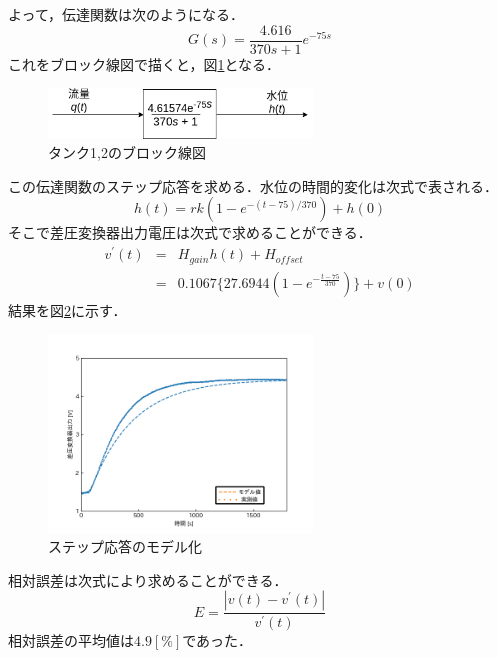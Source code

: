 \documentclass[12pt]{jsarticle}
\begin{document}
よって，伝達関数は次のようになる．
\begin{equation}
  \label{}
  G(s) = \frac{4.616}{370s+1}e^{-75s}
\end{equation}
これをブロック線図で描くと，図\ref{Tank_BlockDiag}となる．
\begin{figure}[tb]
  \begin{center}
    \includegraphics[clip,width=7.0cm]{../img/Tank_BlockDiag.png}
    \caption{タンク1,2のブロック線図}
    \label{Tank_BlockDiag}
  \end{center}
\end{figure}

この伝達関数のステップ応答を求める．水位の時間的変化は次式で表される．
\begin{equation}
  \label{}
  h(t) = rk(1 - e^{-(t - 75)/370}) + h(0)
\end{equation}
そこで差圧変換器出力電圧は次式で求めることができる．
\begin{eqnarray}
  \label{}
  v^{\prime}(t) &=& H_{gain}h(t) + H_{offset} \\
  &=& 0.1067\{27.6944(1-e^{-\frac{t-75}{370}})\} + v(0)\nonumber
\end{eqnarray}
結果を図\ref{StepResponseModeling}に示す．
\begin{figure}[tb]
  \begin{center}
    \includegraphics[clip,width=7.0cm]{../graph/stepResponse_approximity.png}
    \caption{ステップ応答のモデル化}
    \label{StepResponseModeling}
  \end{center}
\end{figure}
相対誤差は次式により求めることができる．
\begin{equation}
  E = \frac{|v(t) - v^{\prime}(t)|}{v^{\prime}(t)}
\end{equation}
相対誤差の平均値は$4.9[\%]$であった．%
\end{document}
